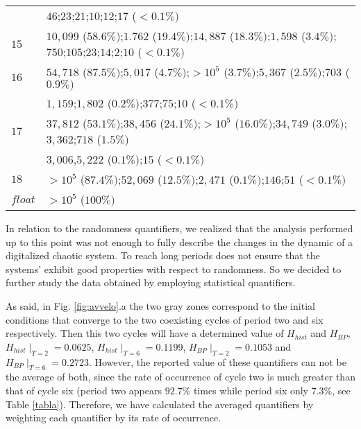 \begin{table*}[!t]
\begin{tabular}{l  l  }
& $46$;$23$;$21$;$10$;$12$;$17$ {\scriptsize($<0.1\%  )$}\\ 
$15$ & $10,099$ {\scriptsize($58.6 \%)$};$1.762$ {\scriptsize($19.4 \%)$};$14,887$ {\scriptsize($18.3\%)$};$1,598$ {\scriptsize($3.4\%)$};$750$;$105$;$23$;$14$;$2$;$10$ {\scriptsize($<0.1\%)$}\\
$16$ & $54,718$ {\scriptsize($87.5\% )$};$5,017$ {\scriptsize($4.7\% )$};$>10^5$ {\scriptsize($3.7\% )$};$5,367$ {\scriptsize($2.5\% )$};$703$ {\scriptsize($0.9\% )$}\\
& $1,159$;$1,802$ {\scriptsize($0.2\% )$};$377$;$75$;$10$ {\scriptsize($<0.1\%  )$}\\  
$17$ & $37,812$ {\scriptsize($53.1\% )$};$38,456$ {\scriptsize($24.1\% )$};$>10^5$ {\scriptsize($16.0\%)$};$34,749$ {\scriptsize($3.0\% )$};$3,362$;$718$ {\scriptsize($1.5\%)$}\\
& $3,006$,$5,222$ {\scriptsize($0.1\% )$};$15$ {\scriptsize($<0.1 \%)$}\\  
$18$ & $>10^5$ {\scriptsize($87.4\%)$};$52,069$ {\scriptsize($12.5\% )$};$2,471$ {\scriptsize($0.1\% )$};$146$;$51$ {\scriptsize($<0.1 \%)$}\\
$float$ & $>10^5$ {\scriptsize($100\% )$}\\
\hline

\end{tabular}

\end{table*}


In relation to the randomness quantifiers, we realized that the analysis performed up to this point was not
enough to fully describe the changes in the dynamic of a digitalized chaotic system. To reach long periods does not ensure that the systems' exhibit good properties with respect to randomness. So we decided to further study the data obtained by employing statistical quantifiers.

As said, in Fig. \ref{fig:avvelo}.a the two gray zones correspond to the initial conditions that converge to the two coexisting cycles of period two and six respectively. Then this two cycles will have a determined value of $H_{hist}$ and $H_{BP}$, $H_{hist}\mid_{T=2}=0.0625$, $H_{hist}\mid_{T=6}=0.1199$, $H_{BP}\mid_{T=2}=0.1053$ and $H_{BP}\mid_{T=6}=0.2723$. However, the reported value of these quantifiers can not be the average of both, since the rate of occurrence of cycle two is much greater than that of cycle six (period two appears $92.7\%$ times while period six only $7.3\%$, see Table \ref{tabla}). Therefore, we have calculated the averaged quantifiers by weighting each quantifier by its rate of occurrence.\\

